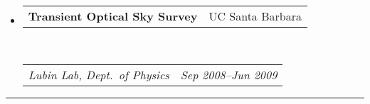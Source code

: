\documentclass[10pt,letterpaper]{article}
\makeatletter
\newcommand{\headerrow}[2]
{\begin{tabular*}{\linewidth}{l@{\extracolsep{\fill}}r}
	#1 &
	#2 \\
\end{tabular*}}
\makeatother
\begin{document}
\begin{itemize}
	\item
	\headerrow
		{\textbf{Transient Optical Sky Survey}}
		{UC Santa Barbara}	\\
	\headerrow
		{\emph{Lubin Lab, Dept.~of Physics}}
		{\emph{Sep 2008--Jun 2009}}
\end{itemize}


\hrule
\end{document}
